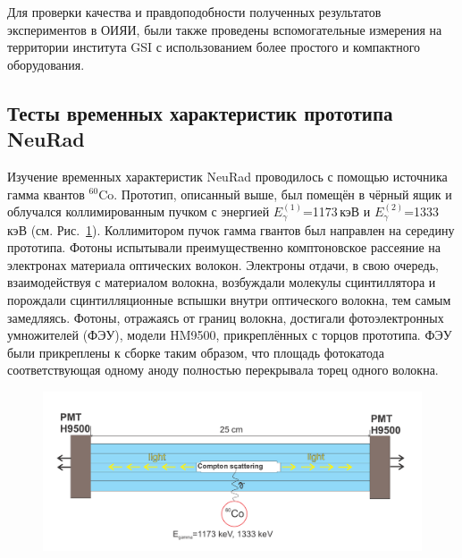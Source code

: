 Для проверки качества и правдоподобности полученных результатов экспериментов в ОИЯИ, были также проведены вспомогательные измерения на территории института GSI с использованием более простого и компактного оборудования.

\subsection{Тесты временных характеристик прототипа NeuRad}
\label{sec:timeTests}
 
Изучение временных характеристик NeuRad проводилось с помощью источника гамма квантов $^{60}$Co.
Прототип, описанный выше, был помещён в чёрный ящик и облучался коллимированным пучком с энергией $E^{(1)}_{\gamma}$=1173\,кэВ и $E^{(2)}_{\gamma}$=1333\,кэВ (см. Рис.~\ref{ris:neuradexp}). Коллимитором пучок гамма гвантов был направлен на середину прототипа. Фотоны испытывали преимущественно комптоновское рассеяние на электронах материала оптических волокон. Электроны отдачи, в свою очередь, взаимодействуя с материалом волокна, возбуждали молекулы сцинтиллятора и порождали сцинтилляционные вспышки внутри оптического волокна, тем самым замедляясь. Фотоны, отражаясь от границ волокна, достигали фотоэлектронных умножителей (ФЭУ), модели HM9500, прикреплённых с торцов прототипа. 
ФЭУ были прикреплены к сборке таким образом, что площадь фотокатода соответствующая одному аноду полностью перекрывала торец одного волокна.



\begin{figure}[!ht]
	\centering
	\includegraphics[width=1\linewidth]{NeuRadexperiment.png}
	\label{ris:neuradexp}
\end{figure}

